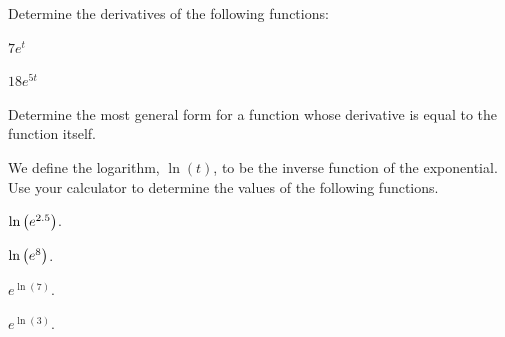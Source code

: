 \begin{problem}
\item Determine the derivatives of the following functions:
  \begin{subproblem}
  \item $7e^{t}$
    \vfill
  \item $18e^{5t}$
    \vfill
  \end{subproblem}
\item Determine the most general form for a function whose derivative
  is equal to the function itself.
  \vfill

\clearpage

\item We define the logarithm, $\ln(t)$, to be the inverse function of
  the exponential.  Use your calculator to determine the values of the
  following functions.
  \begin{subproblem}
  \item $\ln\left( e^{2.5} \right)$.
    \vfill
  \item $\ln\left( e^{8} \right)$.
    \vfill
  \item $e^{\ln(7)}$.
    \vfill
  \item $e^{\ln(3)}$.
    \vfill
  \end{subproblem}



\end{problem}


